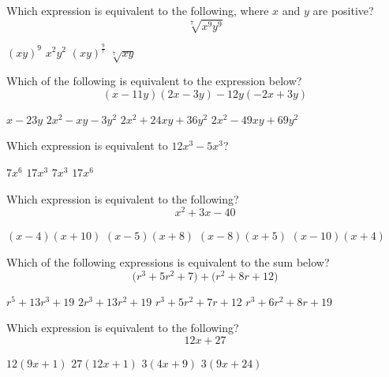 \question[1]
Which expression is equivalent to the following, where $x$ and $y$ are positive?
\[
  \sqrt[7]{x^{9} y^{9}}
\]
\begin{choices}
  \choice $(xy)^{9}$
  \choice $x^{2}y^{2}$
  \CorrectChoice $(xy)^{\frac{9}{7}}$
  \choice $\sqrt[7]{xy}$
\end{choices}

\newpage

\question[1]
Which of the following is equivalent to the expression below?
\[
  (x-11 y)(2 x-3 y)-12 y(-2 x+3 y)
\]
\begin{choices}
  \choice $x-23 y$
  \CorrectChoice $2 x^{2}-x y-3 y^{2}$
  \choice $2 x^{2}+24 x y+36 y^{2}$
  \choice $2 x^{2}-49 x y+69 y^{2}$
\end{choices}

\question[1]
Which expression is equivalent to $12 x^{3}-5 x^{3}$?
\begin{choices}
  \choice $7 x^{6}$
  \choice $17 x^{3}$
  \CorrectChoice $7 x^{3}$
  \choice $17 x^{6}$
\end{choices}

\question[1]
Which expression is equivalent to the following?
\[
  x^{2}+3 x-40
\]
\begin{choices}
  \choice $(x-4)(x+10)$
  \choice $(x-5)(x+8)$
  \CorrectChoice $(x-8)(x+5)$
  \choice $(x-10)(x+4)$
\end{choices}

\newpage


\question[1]
Which of the following expressions is equivalent to the sum below?
\[
  \bigl(r^{3}+5 r^{2}+7\bigr)+\bigl(r^{2}+8 r+12\bigr)
\]
\begin{choices}
  \choice $r^{5}+13 r^{3}+19$
  \choice $2 r^{3}+13 r^{2}+19$
  \choice $r^{3}+5 r^{2}+7 r+12$
  \CorrectChoice $r^{3}+6 r^{2}+8 r+19$
\end{choices}

\question[1]
Which expression is equivalent to the following?
\[
  12 x+27
\]
\begin{choices}
  \choice $12(9 x+1)$
  \choice $27(12 x+1)$
  \CorrectChoice $3(4 x+9)$
  \choice $3(9 x+24)$
\end{choices}


